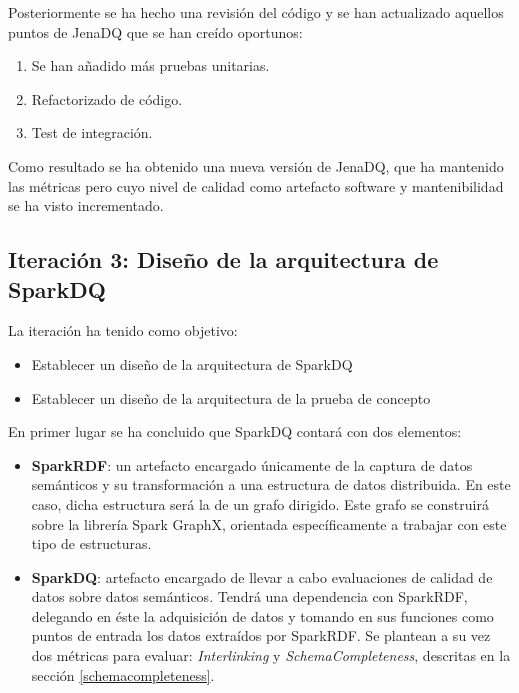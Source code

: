 Posteriormente se ha hecho una revisión del código y se han actualizado aquellos
puntos de JenaDQ que se han creído oportunos:

\begin{enumerate}
\item Se han añadido más pruebas unitarias.
\item Refactorizado de código.
\item Test de integración.
\end{enumerate}

Como resultado se ha obtenido una nueva versión de JenaDQ, que ha mantenido las
métricas pero cuyo nivel de calidad como artefacto software y mantenibilidad se
ha visto incrementado.

\subsection{Iteración 3: Diseño de la arquitectura de SparkDQ}
\label{iteracion3}


La iteración ha tenido como objetivo:

\begin{itemize}
\item Establecer un diseño de la arquitectura de SparkDQ
\item Establecer un diseño de la arquitectura de la prueba de concepto
\end{itemize}

En primer lugar se ha concluido que SparkDQ contará con dos elementos:
\begin{itemize}
\item \textbf{SparkRDF}: un artefacto encargado únicamente de la captura de datos
  semánticos y su transformación a una estructura de datos distribuida. En este
  caso, dicha estructura será la de un grafo dirigido. Este grafo se construirá
  sobre la librería Spark GraphX, orientada específicamente a trabajar con este
  tipo de estructuras.
  \item \textbf{SparkDQ}: artefacto encargado de llevar a cabo evaluaciones de
    calidad de datos sobre datos semánticos. Tendrá una dependencia con
    SparkRDF, delegando en éste la adquisición de datos y tomando en sus
    funciones como puntos de entrada los datos extraídos por SparkRDF. Se
    plantean a su vez dos métricas para evaluar: \textit{Interlinking} y
    \textit{SchemaCompleteness}, descritas en la sección \ref{schemacompleteness}. 
\end{itemize}

